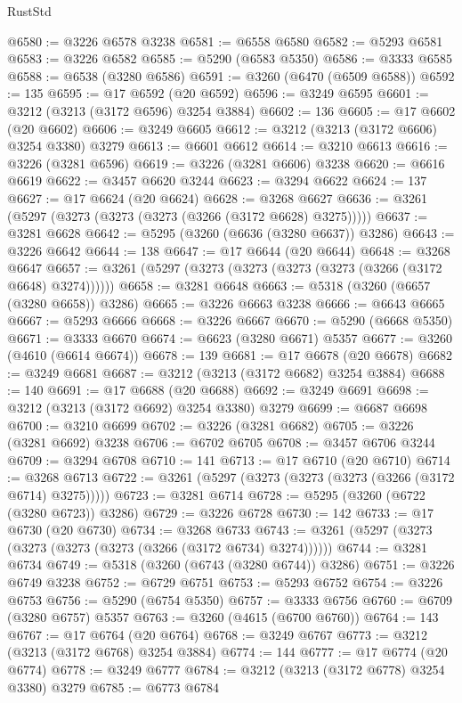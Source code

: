 \begin{lexlean}{RustStd}
\begin{coremodule}
@6580 := @3226 @6578 @3238
@6581 := @6558 @6580
@6582 := @5293 @6581
@6583 := @3226 @6582
@6585 := @5290 (@6583 @5350)
@6586 := @3333 @6585
@6588 := @6538 (@3280 @6586)
@6591 := @3260 (@6470 (@6509 @6588))
@6592 := 135
@6595 := @17 @6592 (@20 @6592)
@6596 := @3249 @6595
@6601 := @3212 (@3213 (@3172 @6596) @3254 @3884)
@6602 := 136
@6605 := @17 @6602 (@20 @6602)
@6606 := @3249 @6605
@6612 := @3212 (@3213 (@3172 @6606) @3254 @3380) @3279
@6613 := @6601 @6612
@6614 := @3210 @6613
@6616 := @3226 (@3281 @6596)
@6619 := @3226 (@3281 @6606) @3238
@6620 := @6616 @6619
@6622 := @3457 @6620 @3244
@6623 := @3294 @6622
@6624 := 137
@6627 := @17 @6624 (@20 @6624)
@6628 := @3268 @6627
@6636 := @3261 (@5297 (@3273 (@3273 (@3273 (@3266 (@3172 @6628) @3275)))))
@6637 := @3281 @6628
@6642 := @5295 (@3260 (@6636 (@3280 @6637)) @3286)
@6643 := @3226 @6642
@6644 := 138
@6647 := @17 @6644 (@20 @6644)
@6648 := @3268 @6647
@6657 := @3261 (@5297 (@3273 (@3273 (@3273 (@3273 (@3266 (@3172 @6648) @3274))))))
@6658 := @3281 @6648
@6663 := @5318 (@3260 (@6657 (@3280 @6658)) @3286)
@6665 := @3226 @6663 @3238
@6666 := @6643 @6665
@6667 := @5293 @6666
@6668 := @3226 @6667
@6670 := @5290 (@6668 @5350)
@6671 := @3333 @6670
@6674 := @6623 (@3280 @6671) @5357
@6677 := @3260 (@4610 (@6614 @6674))
@6678 := 139
@6681 := @17 @6678 (@20 @6678)
@6682 := @3249 @6681
@6687 := @3212 (@3213 (@3172 @6682) @3254 @3884)
@6688 := 140
@6691 := @17 @6688 (@20 @6688)
@6692 := @3249 @6691
@6698 := @3212 (@3213 (@3172 @6692) @3254 @3380) @3279
@6699 := @6687 @6698
@6700 := @3210 @6699
@6702 := @3226 (@3281 @6682)
@6705 := @3226 (@3281 @6692) @3238
@6706 := @6702 @6705
@6708 := @3457 @6706 @3244
@6709 := @3294 @6708
@6710 := 141
@6713 := @17 @6710 (@20 @6710)
@6714 := @3268 @6713
@6722 := @3261 (@5297 (@3273 (@3273 (@3273 (@3266 (@3172 @6714) @3275)))))
@6723 := @3281 @6714
@6728 := @5295 (@3260 (@6722 (@3280 @6723)) @3286)
@6729 := @3226 @6728
@6730 := 142
@6733 := @17 @6730 (@20 @6730)
@6734 := @3268 @6733
@6743 := @3261 (@5297 (@3273 (@3273 (@3273 (@3273 (@3266 (@3172 @6734) @3274))))))
@6744 := @3281 @6734
@6749 := @5318 (@3260 (@6743 (@3280 @6744)) @3286)
@6751 := @3226 @6749 @3238
@6752 := @6729 @6751
@6753 := @5293 @6752
@6754 := @3226 @6753
@6756 := @5290 (@6754 @5350)
@6757 := @3333 @6756
@6760 := @6709 (@3280 @6757) @5357
@6763 := @3260 (@4615 (@6700 @6760))
@6764 := 143
@6767 := @17 @6764 (@20 @6764)
@6768 := @3249 @6767
@6773 := @3212 (@3213 (@3172 @6768) @3254 @3884)
@6774 := 144
@6777 := @17 @6774 (@20 @6774)
@6778 := @3249 @6777
@6784 := @3212 (@3213 (@3172 @6778) @3254 @3380) @3279
@6785 := @6773 @6784

\end{coremodule}
\end{lexlean}
